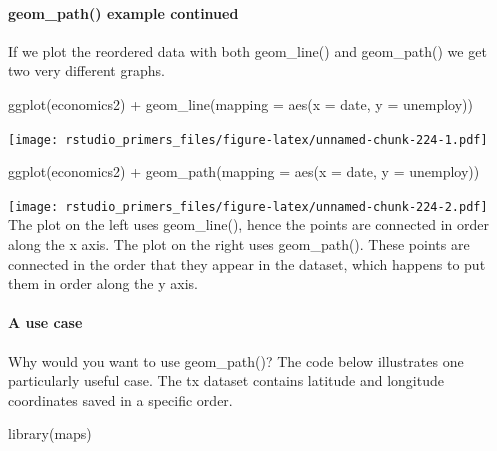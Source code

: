 \documentclass[
]{article}
\newenvironment{Shaded}{\begin{snugshade}}{\end{snugshade}}
\newcommand{\AttributeTok}[1]{\textcolor[rgb]{0.77,0.63,0.00}{#1}}
\newcommand{\FunctionTok}[1]{\textcolor[rgb]{0.00,0.00,0.00}{#1}}
\newcommand{\NormalTok}[1]{#1}
\newcommand{\SpecialCharTok}[1]{\textcolor[rgb]{0.00,0.00,0.00}{#1}}
\begin{document}
\hypertarget{geom_path-example-continued}{%
\paragraph{geom\_path() example
continued}\label{geom_path-example-continued}}

If we plot the reordered data with both geom\_line() and geom\_path() we
get two very different graphs.

\begin{Shaded}
\begin{Highlighting}[]
\FunctionTok{ggplot}\NormalTok{(economics2) }\SpecialCharTok{+}
  \FunctionTok{geom\_line}\NormalTok{(}\AttributeTok{mapping =} \FunctionTok{aes}\NormalTok{(}\AttributeTok{x =}\NormalTok{ date, }\AttributeTok{y =}\NormalTok{ unemploy))}
\end{Highlighting}
\end{Shaded}

\texttt{[image: rstudio\_primers\_files/figure-latex/unnamed-chunk-224-1.pdf]}

\begin{Shaded}
\begin{Highlighting}[]
\FunctionTok{ggplot}\NormalTok{(economics2) }\SpecialCharTok{+}
  \FunctionTok{geom\_path}\NormalTok{(}\AttributeTok{mapping =} \FunctionTok{aes}\NormalTok{(}\AttributeTok{x =}\NormalTok{ date, }\AttributeTok{y =}\NormalTok{ unemploy))}
\end{Highlighting}
\end{Shaded}

\texttt{[image: rstudio\_primers\_files/figure-latex/unnamed-chunk-224-2.pdf]}
The plot on the left uses geom\_line(), hence the points are connected
in order along the x axis. The plot on the right uses geom\_path().
These points are connected in the order that they appear in the dataset,
which happens to put them in order along the y axis.

\hypertarget{a-use-case}{%
\paragraph{A use case}\label{a-use-case}}

Why would you want to use geom\_path()? The code below illustrates one
particularly useful case. The tx dataset contains latitude and longitude
coordinates saved in a specific order.

\begin{Shaded}
\begin{Highlighting}[]
\FunctionTok{library}\NormalTok{(maps)}
\end{Highlighting}
\end{Shaded}
\end{document}
